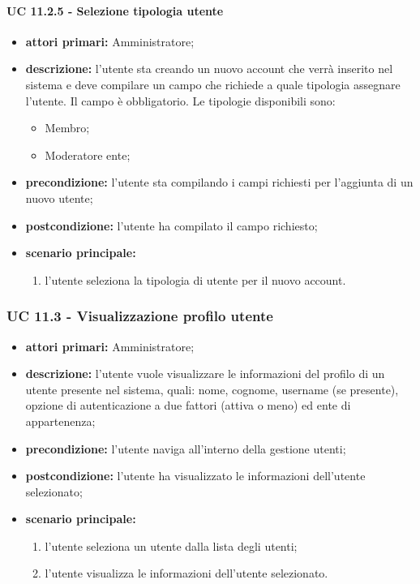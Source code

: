 			\paragraph{UC 11.2.5 - Selezione tipologia utente}
			\begin{itemize}
				\item \textbf{attori primari:} Amministratore;
				\item \textbf{descrizione:} l'utente sta creando un nuovo account che verrà inserito nel sistema e deve compilare un campo che richiede a quale tipologia assegnare l'utente. Il campo è obbligatorio. Le tipologie disponibili sono:
				\begin{itemize}
					\item Membro;
					\item Moderatore ente;
				\end{itemize}
				\item \textbf{precondizione:} l'utente sta compilando i campi richiesti per l'aggiunta di un nuovo utente;
				\item \textbf{postcondizione:} l'utente ha compilato il campo richiesto;
				\item \textbf{scenario principale:}
				\begin{enumerate}
					\item{l'utente seleziona la tipologia di utente per il nuovo account.}
				\end{enumerate}	
			\end{itemize}

			\subsubsection{UC 11.3 - Visualizzazione profilo utente}
			\begin{itemize}
				\item \textbf{attori primari:} Amministratore;
				\item \textbf{descrizione:} l'utente vuole visualizzare le informazioni del profilo di un utente presente nel sistema, quali: nome, cognome, username  (se presente), opzione di autenticazione a due fattori (attiva o meno) ed ente di appartenenza;
				\item \textbf{precondizione:} l'utente naviga all'interno della gestione utenti;
				\item \textbf{postcondizione:} l'utente ha visualizzato le informazioni dell'utente selezionato;
				\item \textbf{scenario principale:}
				\begin{enumerate}
					\item{l'utente seleziona un utente dalla lista degli utenti;}
					\item{l'utente visualizza le informazioni dell'utente selezionato.}
				\end{enumerate}
			\end{itemize}


